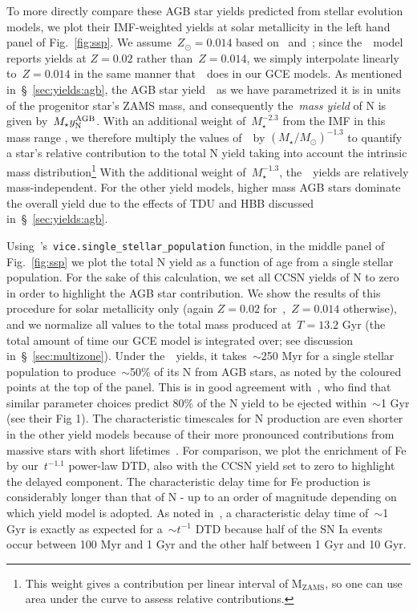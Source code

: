 \documentclass[ms.tex]{subfiles}
\begin{document}
To more directly compare these AGB star yields predicted from stellar
evolution models, we plot their IMF-weighted yields at solar metallicity in the
left hand panel of Fig.~\ref{fig:ssp}.
We assume~$Z_\odot = 0.014$ based on~\citet{Asplund2009}
and~\citet*{Asplund2021}; since the~\karakasten~model reports yields at
$Z = 0.02$ rather than~$Z = 0.014$, we simply interpolate linearly
to~$Z = 0.014$ in the same manner that~\vice~does in our GCE models.
As mentioned in~\S~\ref{sec:yields:agb}, the AGB star yield~~as we
have parametrized it is in units of the progenitor star's ZAMS mass, and
consequently the~\textit{mass yield} of N is given by~$M_\star y_\text{N}^\text{AGB}$.
With an additional weight of~$M_\star^{-2.3}$ from the IMF in this mass range
\citep[e.g.][]{Kroupa2001}, we therefore multiply the values of~~by
$(M_\star / M_\odot)^{-1.3}$ to quantify a star's relative contribution to the
total N yield taking into account the intrinsic mass distribution\footnote{
	This weight gives a contribution per linear interval of M$_\text{ZAMS}$, so
	one can use area under the curve to assess relative contributions.
}
With the additional weight of~$M_\star^{-1.3}$, the~\cristallo~yields are
relatively mass-independent.
For the other yield models, higher mass AGB stars dominate the overall yield
due to the effects of TDU and HBB discussed in~\S~\ref{sec:yields:agb}.
\par
Using~\vice's~\texttt{vice.single\_stellar\_population} function, in the
middle panel of Fig.~\ref{fig:ssp} we plot the total N yield as a function of
age from a single stellar population.
For the sake of this calculation, we set all CCSN yields of N to zero in order
to highlight the AGB star contribution.
We show the results of this procedure for solar metallicity only (again
$Z = 0.02$ for~\karakasten,~$Z = 0.014$ otherwise), and we normalize all values
to the total mass produced at~$T = 13.2$ Gyr (the total amount of time our GCE
model is integrated over; see discussion in~\S~\ref{sec:multizone}).
Under the~\cristallo~yields, it takes~$\sim$250 Myr for a single stellar
population to produce~$\sim$50\% of its N from AGB stars, as noted by the
coloured points at the top of the panel.
This is in good agreement with~\citet{Maiolino2019}, who find that similar
parameter choices predict 80\% of the N yield to be ejected within~$\sim$1 Gyr
(see their Fig 1).
The characteristic timescales for N production are even shorter in the other
yield models because of their more pronounced contributions from massive stars
with short lifetimes~\citep[e.g.][]{Larson1974, Maeder1989, Padovani1993}.
For comparison, we plot the enrichment of Fe by our~$t^{-1.1}$ power-law DTD,
also with the CCSN yield set to zero to highlight the delayed component.
The characteristic delay time for Fe production is considerably longer than
that of N - up to an order of magnitude depending on which yield model is
adopted.
As noted in~\citet{Johnson2021}, a characteristic delay time of~$\sim$1 Gyr
is exactly as expected for a~$\sim t^{-1}$ DTD because half of the SN Ia
events occur between 100 Myr and 1 Gyr and the other half between 1 Gyr and
10 Gyr.
\end{document}
